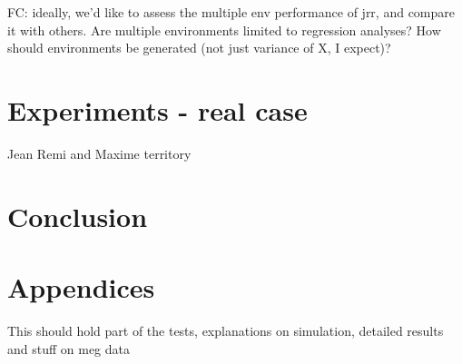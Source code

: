 \documentclass{article}
\begin{document}
FC: ideally, we'd like to assess the multiple env performance of jrr, and compare it with others. Are multiple environments limited to regression analyses? How should environments be generated (not just variance of X, I expect)?


\section{Experiments - real case}
Jean Remi and Maxime territory

\section{Conclusion}


\clearpage
\newpage




\section{Appendices}

This should hold part of the tests, explanations on simulation, detailed results and stuff on meg data
\end{document}
